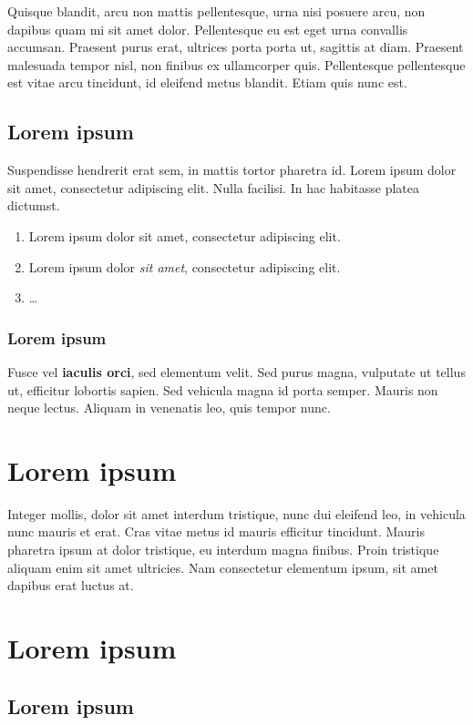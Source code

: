 Quisque blandit, arcu non mattis pellentesque, urna nisi posuere arcu, non dapibus quam mi sit amet dolor. Pellentesque eu est eget urna convallis accumsan. Praesent purus erat, ultrices porta porta ut, sagittis at diam. Praesent malesuada tempor nisl, non finibus ex ullamcorper quis. Pellentesque pellentesque est vitae arcu tincidunt, id eleifend metus blandit. Etiam quis nunc est.

\subsection{Lorem ipsum}

Suspendisse hendrerit erat sem, in mattis tortor pharetra id. Lorem ipsum dolor sit amet, consectetur adipiscing elit. Nulla facilisi. In hac habitasse platea dictumst.
\begin{enumerate}
\item Lorem ipsum dolor sit amet, consectetur adipiscing elit.
\item Lorem ipsum dolor \textit{sit amet}, consectetur adipiscing elit.
\item \ldots
\end{enumerate}

\subsubsection{Lorem ipsum}

Fusce vel \textbf{iaculis orci}, sed elementum velit. Sed purus magna, vulputate ut tellus ut, efficitur lobortis sapien. Sed vehicula magna id porta semper. Mauris non neque lectus. Aliquam in venenatis leo, quis tempor nunc.

\section{Lorem ipsum}

Integer mollis, dolor sit amet interdum tristique, nunc dui eleifend leo, in vehicula nunc mauris et erat. Cras vitae metus id mauris efficitur tincidunt. Mauris pharetra ipsum at dolor tristique, eu interdum magna finibus. Proin tristique aliquam enim sit amet ultricies. Nam consectetur elementum ipsum, sit amet dapibus erat luctus at.

\section{Lorem ipsum}

\subsection{Lorem ipsum}

